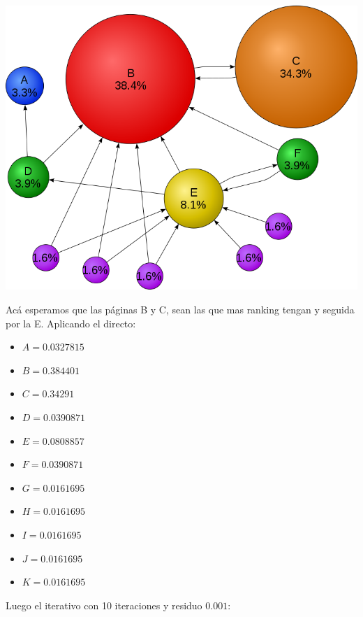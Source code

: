 \begin{itemize}
	\begin{center}
	  \centering
	  \includegraphics[scale=0.4]{../graficos/744px-PageRanks-Example.png}
	  \label{fig: Caso con 11 páginas}
	\end{center}

        Acá esperamos que las páginas B y C, sean las que mas ranking tengan y seguida por la E. Aplicando el directo:

        \begin{itemize}
            \item $A = 0.0327815$
            \item $B = 0.384401$
            \item $C = 0.34291$
            \item $D = 0.0390871$
            \item $E = 0.0808857$
            \item $F = 0.0390871$
            \item $G = 0.0161695$
            \item $H = 0.0161695$
            \item $I = 0.0161695$
            \item $J = 0.0161695$
            \item $K = 0.0161695$
        \end{itemize}

        Luego el iterativo con 10 iteraciones y residuo $0.001$:


\end{itemize}
